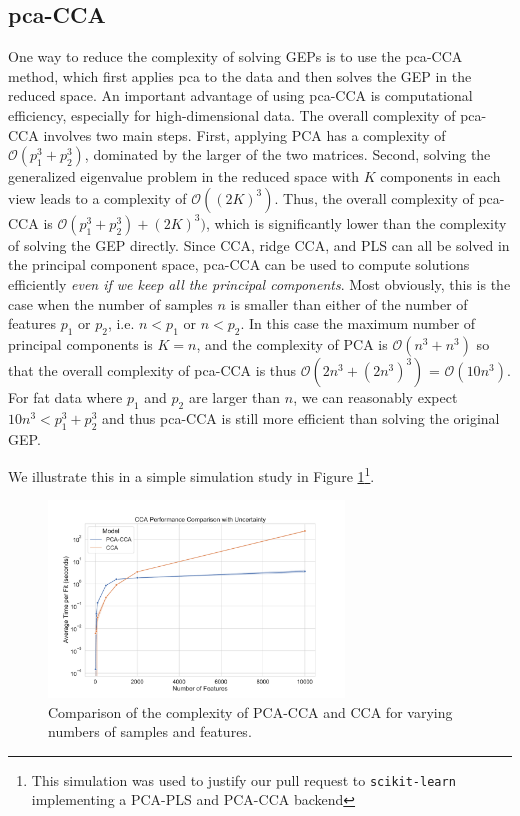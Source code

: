 \subsection{\acrshort{pca}-CCA}

One way to reduce the complexity of solving GEPs is to use the \acrshort{pca}-CCA method, which first applies \acrshort{pca} to the data and then solves the GEP in the reduced space.
An important advantage of using \acrshort{pca}-CCA is computational efficiency, especially for high-dimensional data.
The overall complexity of \acrshort{pca}-CCA involves two main steps.
First, applying PCA has a complexity of \( \mathcal{O}(p_1^3+ p_2^3) \), dominated by the larger of the two matrices.
Second, solving the generalized eigenvalue problem in the reduced space with \( K \) components in each view leads to a complexity of \( \mathcal{O}((2K)^3) \).
Thus, the overall complexity of \acrshort{pca}-CCA is \( \mathcal{O}(p_1^3+ p_2^3) + (2K)^3) \), which is significantly lower than the complexity of solving the GEP directly.
Since CCA, ridge CCA, and PLS can all be solved in the principal component space, \acrshort{pca}-CCA can be used to compute solutions efficiently \textit{even if we keep all the principal components}.
Most obviously, this is the case when the number of samples \( n \) is smaller than either of the number of features \( p_1 \) or \( p_2 \), i.e. \( n < p_1 \) or \( n < p_2 \).
In this case the maximum number of principal components is \( K=n \), and the complexity of PCA is \( \mathcal{O}(n^3+ n^3) \) so that the overall complexity of \acrshort{pca}-CCA is thus \( \mathcal{O}(2n^3+(2n^3)^3) \) = \( \mathcal{O}(10n^3) \).
For fat data where \( p_1 \) and \( p_2 \) are larger than \( n \), we can reasonably expect $10n^3<p_1^3+ p_2^3$ and thus \acrshort{pca}-CCA is still more efficient than solving the original GEP.

We illustrate this in a simple simulation study in Figure \ref{fig:pca-cca-complexity}\footnote{This simulation was used to justify our pull request to \texttt{scikit-learn}\citep{pedregosa2011scikit} implementing a PCA-PLS and PCA-CCA backend}.

 \begin{figure}
     \centering
     \includegraphics[width=0.7\textwidth]{figures/benchmarks/ccapca_comparison_log}
     \caption{Comparison of the complexity of PCA-CCA and CCA for varying numbers of samples and features.}
     \label{fig:pca-cca-complexity}
 \end{figure}

